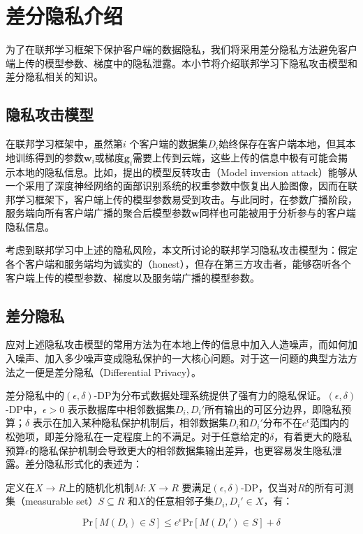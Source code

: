\section{差分隐私介绍}

为了在联邦学习框架下保护客户端的数据隐私，我们将采用差分隐私方法避免客户端上传的模型参数、梯度中的隐私泄露。本小节将介绍联邦学习下隐私攻击模型和差分隐私相关的知识。

\subsection{隐私攻击模型}

在联邦学习框架中，虽然第$i$ 个客户端的数据集$D_i$始终保存在客户端本地，但其本地训练得到的参数$\mathbf{w}_i$或梯度$\mathbf{g}_i$需要上传到云端，这些上传的信息中极有可能会揭示本地的隐私信息。比如，\parencite{fredrikson2015model}提出的模型反转攻击（Model inversion attack）能够从一个采用了深度神经网络的面部识别系统的权重参数中恢复出人脸图像，因而在联邦学习框架下，客户端上传的模型参数易受到攻击。与此同时，在参数广播阶段，服务端向所有客户端广播的聚合后模型参数$\mathbf{w}$同样也可能被用于分析参与的客户端隐私信息。

考虑到联邦学习中上述的隐私风险，本文所讨论的联邦学习隐私攻击模型为：假定各个客户端和服务端均为诚实的（honest），但存在第三方攻击者，能够窃听各个客户端上传的模型参数、梯度以及服务端广播的模型参数。

\subsection{差分隐私}

应对上述隐私攻击模型的常用方法为在本地上传的信息中加入人造噪声，而如何加入噪声、加入多少噪声变成隐私保护的一大核心问题。对于这一问题的典型方法方法之一便是差分隐私（Differential Privacy）。

差分隐私中的$(\epsilon, \delta)$-DP\cite{dwork2014algorithmic}为分布式数据处理系统提供了强有力的隐私保证。$(\epsilon, \delta)$-DP中，$\epsilon > 0$ 表示数据库中相邻数据集$D_i,D_i'$所有输出的可区分边界，即隐私预算；$\delta$ 表示在加入某种隐私保护机制后，相邻数据集$D_i$和$D_i'$分布不在$e^\epsilon$范围内的松弛项，即差分隐私在一定程度上的不满足。对于任意给定的$\delta$，有着更大的隐私预算$\epsilon$的隐私保护机制会导致更大的相邻数据集输出差异，也更容易发生隐私泄露。差分隐私形式化的表述为：

\begin{definition}
  定义在$X\rightarrow R$上的随机化机制$M: X \rightarrow R$ 要满足$(\epsilon, \delta)$-DP，仅当对$R$的所有可测集（measurable set）$S\subseteq R$ 和$X$的任意相邻子集$D_i, D_i'\in X$，有：

  \begin{equation}
    \text{Pr}\left[ M(D_i)\in S\right] 
    \le e^\epsilon \text{Pr}\left[ M(D_i')\in S\right] + \delta
  \end{equation}
\end{definition}

